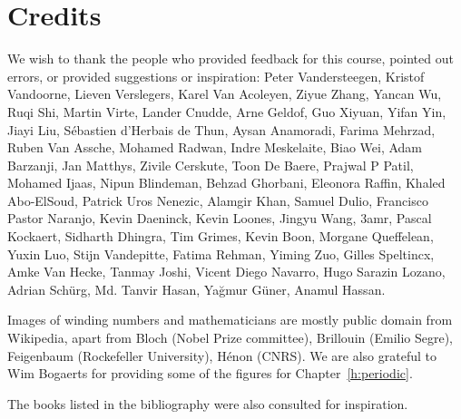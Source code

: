 \chapter{Credits}
\label{h:credits}

We wish to thank the people who provided feedback for this course, pointed out errors, or provided suggestions or inspiration: Peter Vandersteegen, Kristof Vandoorne, Lieven Verslegers, Karel Van Acoleyen, Ziyue Zhang, Yancan Wu, Ruqi Shi, Martin Virte, Lander Cnudde, Arne Geldof, Guo Xiyuan, Yifan Yin, Jiayi Liu, S\'ebastien d’Herbais de Thun, Aysan Anamoradi, Farima Mehrzad, Ruben Van Assche, Mohamed Radwan, Indre Meskelaite, Biao Wei, Adam Barzanji, Jan Matthys, Zivile Cerskute, Toon De Baere, Prajwal P Patil, Mohamed Ijaas, Nipun Blindeman, Behzad Ghorbani, Eleonora Raffin, Khaled Abo-ElSoud, Patrick Uros Nenezic, Alamgir Khan, Samuel Dulio, Francisco Pastor Naranjo, Kevin Daeninck, Kevin Loones, Jingyu Wang, 3amr, Pascal Kockaert, Sidharth Dhingra, Tim Grimes, Kevin Boon, Morgane Queffelean, Yuxin Luo, Stijn Vandepitte, Fatima Rehman, Yiming Zuo, Gilles Speltincx, Amke Van Hecke, Tanmay Joshi, Vicent Diego Navarro, Hugo Sarazin Lozano, Adrian Sch\"urg, Md. Tanvir Hasan, Ya\u{g}mur G\"uner, Anamul Hassan.

Images of winding numbers and mathematicians are mostly public domain from Wikipedia, apart from Bloch (Nobel Prize committee), Brillouin (Emilio Segre), Feigenbaum (Rockefeller University), H\'{e}non (CNRS). We are also grateful to Wim Bogaerts for providing some of the figures for Chapter~\ref{h:periodic}.

The books listed in the bibliography were also consulted for inspiration.

